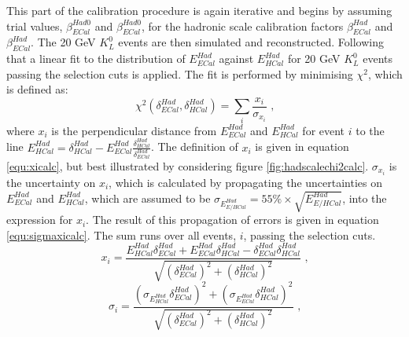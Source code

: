 This part of the calibration procedure is again iterative and begins by assuming trial values, $\beta^{Had0}_{ECal}$ and $\beta^{Had0}_{ECal}$, for the hadronic scale calibration factors $\beta^{Had}_{ECal}$ and $\beta^{Had}_{ECal}$.  The 20 GeV $K^{0}_{L}$ events are then simulated and reconstructed.  Following that a linear fit to the distribution of $E^{Had}_{ECal}$ against $E^{Had}_{HCal}$ for 20 GeV $K^{0}_{L}$ events passing the selection cuts is applied.  The fit is performed by minimising $\chi^{2}$, which is defined as:
%
\begin{equation}
\chi^{2}(\delta^{Had}_{ECal}, \delta^{Had}_{HCal}) = \sum_{i} \frac{x_{i}}{\sigma_{x_{i}}}\text{ ,}
\end{equation}
%
\noindent where $x_{i}$ is the perpendicular distance from $E^{Had}_{ECal}$ and $E^{Had}_{HCal}$ for event $i$ to the line $E^{Had}_{HCal} = \delta^{Had}_{HCal} - E^{Had}_{ECal} \frac{\delta^{Had}_{HCal}}{\delta^{Had}_{ECal}}$.   The definition of $x_{i}$ is given in equation \ref{equ:xicalc}, but best illustrated by considering figure \ref{fig:hadscalechi2calc}.  $\sigma_{x_{i}}$ is the uncertainty on $x_{i}$, which is calculated by propagating the uncertainties on $E^{Had}_{ECal}$ and $E^{Had}_{HCal}$, which are assumed to be $\sigma_{E^{Had}_{E/HCal}} = 55\% \times \sqrt{E^{Had}_{E/HCal}}$, into the expression for $x_{i}$.  The result of this propagation of errors is given in equation \ref{equ:sigmaxicalc}.  The sum runs over all events, $i$, passing the selection cuts.  
%
\begin{equation}
x_{i} = \frac{E^{Had}_{HCal} \delta^{Had}_{ECal} + E^{Had}_{ECal} \delta^{Had}_{HCal} - \delta^{Had}_{ECal} \delta^{Had}_{HCal}}{\sqrt{(\delta^{Had}_{ECal})^{2} + (\delta^{Had}_{HCal})^{2}}}\text{ ,}
\label{equ:xicalc}
\end{equation}
\begin{equation}
\sigma_{i} = \frac{(\sigma_{E^{Had}_{HCal}}  \delta^{Had}_{ECal})^{2} + (\sigma_{E^{Had}_{ECal}} \delta^{Had}_{HCal})^{2}}{\sqrt{(\delta^{Had}_{ECal})^{2} + (\delta^{Had}_{HCal})^{2}}}\text{ ,}
\label{equ:sigmaxicalc}
\end{equation}
%
